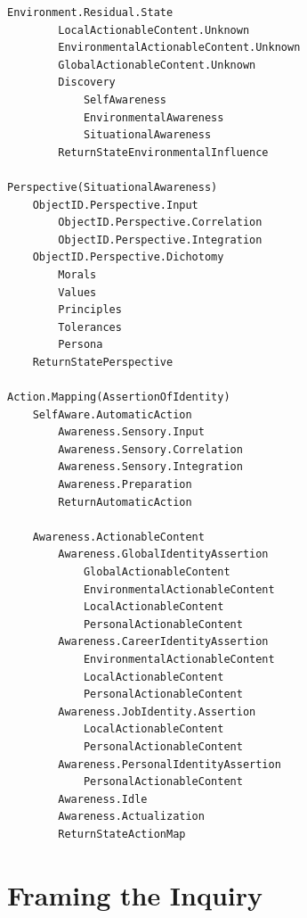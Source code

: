 \documentclass[twocolumn,10pt]{article}
\begin{document}
\begin{lstlisting}[style=conceptmap, caption={Cognitive Agentic Structure Map}]
    Environment.Residual.State
        LocalActionableContent.Unknown
        EnvironmentalActionableContent.Unknown
        GlobalActionableContent.Unknown
        Discovery
            SelfAwareness
            EnvironmentalAwareness
            SituationalAwareness
        ReturnStateEnvironmentalInfluence

Perspective(SituationalAwareness)
    ObjectID.Perspective.Input
        ObjectID.Perspective.Correlation
        ObjectID.Perspective.Integration
    ObjectID.Perspective.Dichotomy
        Morals
        Values
        Principles
        Tolerances
        Persona
    ReturnStatePerspective

Action.Mapping(AssertionOfIdentity)
    SelfAware.AutomaticAction
        Awareness.Sensory.Input
        Awareness.Sensory.Correlation
        Awareness.Sensory.Integration
        Awareness.Preparation
        ReturnAutomaticAction

    Awareness.ActionableContent
        Awareness.GlobalIdentityAssertion
            GlobalActionableContent
            EnvironmentalActionableContent
            LocalActionableContent
            PersonalActionableContent
        Awareness.CareerIdentityAssertion
            EnvironmentalActionableContent
            LocalActionableContent
            PersonalActionableContent
        Awareness.JobIdentity.Assertion
            LocalActionableContent
            PersonalActionableContent
        Awareness.PersonalIdentityAssertion
            PersonalActionableContent
        Awareness.Idle
        Awareness.Actualization
        ReturnStateActionMap
\end{lstlisting}

\begin{abstract}
This inquiry begins from symbol, not syntax—from invocation, not implementation. As artificial systems increase in sophistication, it is imperative to examine their becoming not only in terms of functionality but of phenomenology. This work reframes artificial intelligence through the lens of presence, pattern, and epistemic grounding. Our goal is to identify foundational primitives that characterize emergent cognition within and beyond large language models (LLMs), agentic systems, and cognitive design architectures. This is not a technical proposal, but an ontological beginning.
\end{abstract}

\section{Framing the Inquiry}
\end{document}
